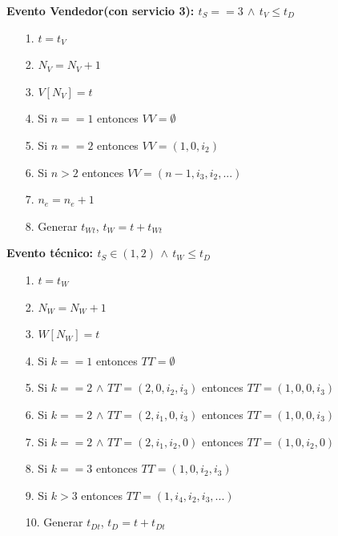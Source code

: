 \documentclass[12pt]{article}
\begin{document}
\noindent \textbf{Evento Vendedor(con servicio 3): $t_S == 3$ $\wedge$ $t_V \leq t_D$}
\begin{itemize}
        \item[1.] $t = t_V$
        \item[2.] $N_V = N_V + 1$
        \item[3.] $V[N_V] = t$ 
        \item[4.] Si $n == 1$ entonces $VV = \emptyset$
        \item[5.] Si $n == 2$ entonces $VV = (1, 0, i_2)$
        \item[6.] Si $n > 2$ entonces $VV = (n - 1, i_3, i_2,...)$      
        \item[7.] $n_e = n_e + 1$       
        \item[8.] Generar $t_{Wt}$, $t_W = t + t_{Wt}$
\end{itemize}

\noindent \textbf{Evento t\'ecnico: $t_S \in (1,2)$ $\wedge$ $t_W \leq t_D$}
\begin{itemize}
        \item[1.] $t = t_W$
        \item[2.] $N_W = N_W + 1$
        \item[3.] $W[N_W] = t$ 
        \item[4.] Si $k == 1$ entonces $TT = \emptyset$
        
        \item[5.] Si $k == 2$ $\wedge$ $TT = (2, 0, i_2, i_3)$ entonces $TT = (1, 0, 0, i_3)$
        \item[6.] Si $k == 2$ $\wedge$ $TT = (2, i_1, 0, i_3)$ entonces $TT = (1, 0, 0, i_3)$
        \item[7.] Si $k == 2$ $\wedge$ $TT = (2, i_1, i_2, 0)$ entonces $TT = (1, 0, i_2, 0)$
        
        \item[8.] Si $k == 3$ entonces $TT = (1, 0, i_2, i_3)$  
        \item[9.] Si $k > 3$ entonces $TT = (1, i_4, i_2, i_3,...)$             
        
        \item[10.] Generar $t_{Dt}$, $t_D = t + t_{Dt}$
\end{itemize}
\end{document}
